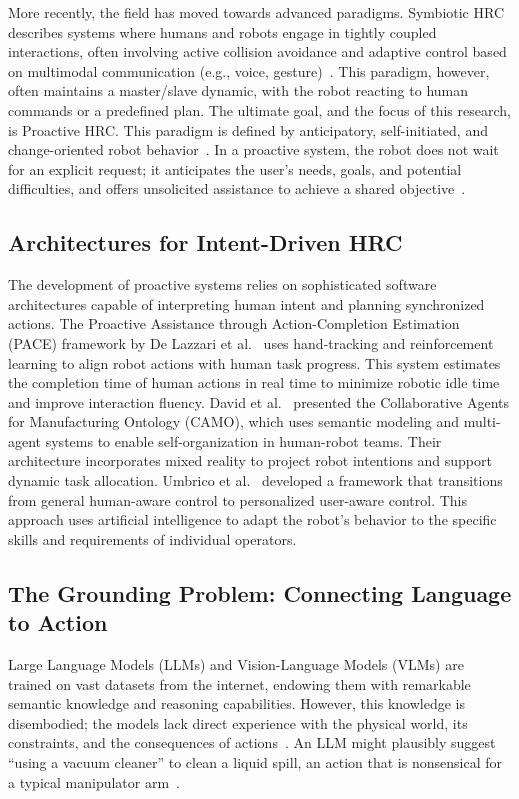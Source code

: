 \documentclass[11pt, a4paper]{article}
\begin{document}
More recently, the field has moved towards advanced paradigms. Symbiotic HRC describes systems where humans and robots engage in tightly coupled interactions, often involving active collision avoidance and adaptive control based on multimodal communication (e.g., voice, gesture)~\cite{Andronas2021, Asad2023}. This paradigm, however, often maintains a master/slave dynamic, with the robot reacting to human commands or a predefined plan. The ultimate goal, and the focus of this research, is Proactive HRC. This paradigm is defined by anticipatory, self-initiated, and change-oriented robot behavior~\cite{Sirintuna2024}. In a proactive system, the robot does not wait for an explicit request; it anticipates the user's needs, goals, and potential difficulties, and offers unsolicited assistance to achieve a shared objective~\cite{Andronas2021, Nezhad2020}.

\subsection{Architectures for Intent-Driven HRC}

The development of proactive systems relies on sophisticated software architectures capable of interpreting human intent and planning synchronized actions. The Proactive Assistance through Action-Completion Estimation (PACE) framework by De Lazzari et al.~\cite{PACE} uses hand-tracking and reinforcement learning to align robot actions with human task progress. This system estimates the completion time of human actions in real time to minimize robotic idle time and improve interaction fluency. David et al.~\cite{David2023} presented the Collaborative Agents for Manufacturing Ontology (CAMO), which uses semantic modeling and multi-agent systems to enable self-organization in human-robot teams. Their architecture incorporates mixed reality to project robot intentions and support dynamic task allocation. Umbrico et al.~\cite{Umbrico2022} developed a framework that transitions from general human-aware control to personalized user-aware control. This approach uses artificial intelligence to adapt the robot's behavior to the specific skills and requirements of individual operators. %

\subsection{The Grounding Problem: Connecting Language to Action}

Large Language Models (LLMs) and Vision-Language Models (VLMs) are trained on vast datasets from the internet, endowing them with remarkable semantic knowledge and reasoning capabilities. However, this knowledge is disembodied; the models lack direct experience with the physical world, its constraints, and the consequences of actions~\cite{Chi2023}. An LLM might plausibly suggest ``using a vacuum cleaner'' to clean a liquid spill, an action that is nonsensical for a typical manipulator arm~\cite{Ahn2022}.
\end{document}
